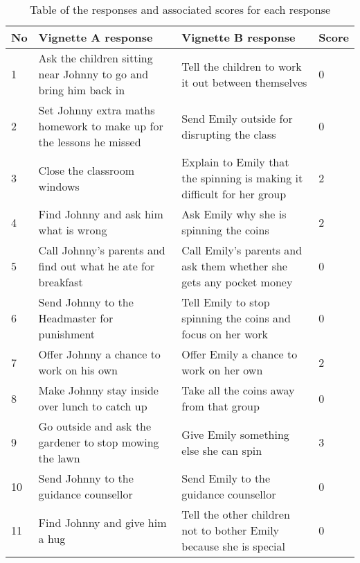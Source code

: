 \begin{table}[H]
    \begin{tabular}{ |p{1cm} | p{8cm} | p{8cm} | p{1cm} |}
    \hline
    No & \textbf{Vignette A response} & \textbf{Vignette B response} & \textbf{Score} \\                                                                                                                                                                                    
	\hline
	1 & Ask the children sitting near Johnny to go and bring him back in & Tell the children to work it out between themselves & 0 \\ \hline
 	2 & Set Johnny extra maths homework to make up for the lessons he missed & Send Emily outside for disrupting the class & 0 \\ \hline
 	3 & Close the classroom windows & Explain to Emily that the spinning is making it difficult for her group & 2 \\ \hline
	4 & Find Johnny and ask him what is wrong & Ask Emily why she is spinning the coins & 2 \\ \hline
	5 & Call Johnny’s parents and find out what he ate for breakfast & 	Call Emily’s parents and ask them whether she gets any pocket money & 0 \\ \hline
	6 & Send Johnny to the Headmaster for punishment & Tell Emily to stop spinning the coins and focus on her work & 0 \\ \hline
	7 & Offer Johnny a chance to work on his own & 	Offer Emily a chance to work on her own & 2 \\ \hline
	8 & Make Johnny stay inside over lunch to catch up & Take all the coins away from that group &  0 \\ \hline
	9 & Go outside and ask the gardener to stop mowing the lawn & Give Emily something else she can spin & 3 \\ \hline
	10 & Send Johnny to the guidance counsellor & Send Emily to the guidance counsellor &  0 \\ \hline
	11 & Find Johnny and give him a hug & Tell the other children not to bother Emily because she is special & 0 \\ 
    \hline
    \end{tabular}
    \caption{Table of the responses and associated scores for each response}
\end{table}

